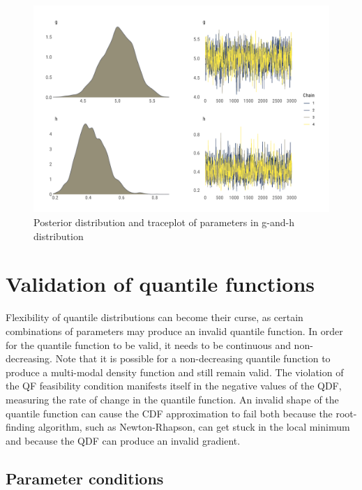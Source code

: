 \documentclass[
  12pt,
]{article}
\begin{document}
\begin{figure}

{\centering \includegraphics[width=0.8\linewidth]{ilbm_article_files/figure-latex/gnh-combo-graph-1} 

}

\caption{Posterior distribution and traceplot of parameters in g-and-h distribution}\label{fig:gnh-combo-graph}
\end{figure}

\hypertarget{validation-of-quantile-functions}{%
\section{Validation of quantile functions}\label{validation-of-quantile-functions}}

Flexibility of quantile distributions can become their curse, as certain combinations of parameters may produce an invalid quantile function. In order for the quantile function to be valid, it needs to be continuous and non-decreasing. Note that it is possible for a non-decreasing quantile function to produce a multi-modal density function and still remain valid. The violation of the QF feasibility condition manifests itself in the negative values of the QDF, measuring the rate of change in the quantile function. An invalid shape of the quantile function can cause the CDF approximation to fail both because the root-finding algorithm, such as Newton-Rhapson, can get stuck in the local minimum and because the QDF can produce an invalid gradient.

\hypertarget{parameter-conditions}{%
\subsection{Parameter conditions}\label{parameter-conditions}}
\end{document}
